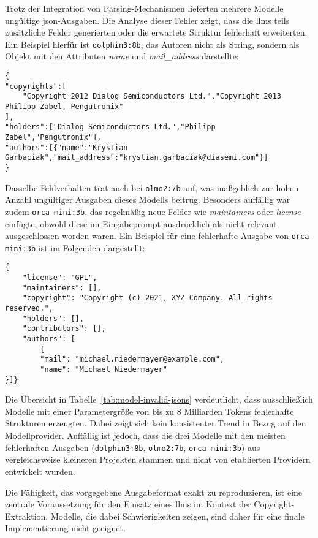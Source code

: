 Trotz der Integration von Parsing-Mechanismen lieferten mehrere Modelle ungültige \gls{json}-Ausgaben.
Die Analyse dieser Fehler zeigt, dass die \glspl{llm} teils zusätzliche Felder generierten oder die erwartete Struktur fehlerhaft erweiterten.
Ein Beispiel hierfür ist \texttt{dolphin3:8b}, das Autoren nicht als String, sondern als Objekt mit den Attributen \textit{name} und \textit{mail\_address} darstellte:

\begin{lstlisting}[keepspaces=true]
{
"copyrights":[
    "Copyright 2012 Dialog Semiconductors Ltd.","Copyright 2013 Philipp Zabel, Pengutronix"
],
"holders":["Dialog Semiconductors Ltd.","Philipp Zabel","Pengutronix"],
"authors":[{"name":"Krystian Garbaciak","mail_address":"krystian.garbaciak@diasemi.com"}]
}
\end{lstlisting}

Dasselbe Fehlverhalten trat auch bei \texttt{olmo2:7b} auf, was maßgeblich zur hohen Anzahl ungültiger Ausgaben dieses Modells beitrug.
Besonders auffällig war zudem \texttt{orca-mini:3b}, das regelmäßig neue Felder wie \textit{maintainers} oder \textit{license} einfügte, obwohl diese im Eingabeprompt ausdrücklich als nicht relevant ausgeschlossen worden waren.
Ein Beispiel für eine fehlerhafte Ausgabe von \texttt{orca-mini:3b} ist im Folgenden dargestellt:

\begin{lstlisting}[keepspaces=true]
{
    "license": "GPL",
    "maintainers": [],
    "copyright": "Copyright (c) 2021, XYZ Company. All rights reserved.",
    "holders": [],
    "contributors": [],
    "authors": [
        {
        "mail": "michael.niedermayer@example.com",
        "name": "Michael Niedermayer"
}]}
\end{lstlisting}

Die Übersicht in Tabelle~\ref{tab:model-invalid-jsons} verdeutlicht, dass ausschließlich Modelle mit einer Parametergröße von bis zu 8 Milliarden Tokens fehlerhafte Strukturen erzeugten.
Dabei zeigt sich kein konsistenter Trend in Bezug auf den Modellprovider.
Auffällig ist jedoch, dass die drei Modelle mit den meisten fehlerhaften Ausgaben (\texttt{dolphin3:8b}, \texttt{olmo2:7b}, \texttt{orca-mini:3b}) aus vergleichsweise kleineren Projekten stammen und nicht von etablierten Providern entwickelt wurden.

Die Fähigkeit, das vorgegebene Ausgabeformat exakt zu reproduzieren, ist eine zentrale Voraussetzung für den Einsatz eines \glspl{llm} im Kontext der Copyright-Extraktion.
Modelle, die dabei Schwierigkeiten zeigen, sind daher für eine finale Implementierung nicht geeignet.

